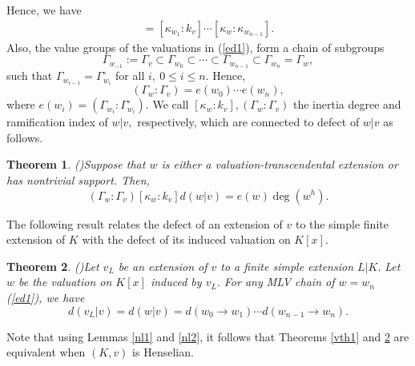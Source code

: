 \documentclass[11pt]{amsart}
\newtheorem{theorem}{Theorem}[section]
\theoremstyle{definition}
\theoremstyle{remark}
\numberwithin{equation}{section}
\begin{document}
	Hence, we have
	\begin{align*}
		[\kappa_w:k_v]=[\kappa_{w_1}:k_v]\cdots [\kappa_w:\kappa_{w_{n-1}}].
	\end{align*}
	Also, the value groups of the valuations in (\ref{ed1}), form a chain of subgroups
	\[\Gamma_{w_{-1}}:=\Gamma_v \subset \Gamma_{w_0} \subset \cdots \subset \Gamma_{w_{n-1}}\subset \Gamma_{w_n}=\Gamma_w, \]
	such that $\Gamma_{w_{i-1}}=\Gamma^\circ_{w_i}$ for all $i, \ 0\leq i \leq n.$ Hence,
	\[(\Gamma_w:\Gamma_v)=e(w_0)\cdots e(w_n),\] where $e(w_i)=(\Gamma_{w_i}:\Gamma^\circ_{w_i}).$ We call $[\kappa_w:k_v], (\Gamma_w:\Gamma_v)$ the inertia degree and  ramification index of $w|v,$ respectively, which are connected to defect of $w|v$ as follows.


	\begin{theorem}(\cite[Theorem 6.13]{EN3})\label{T1}
		Suppose that $w$ is either a valuation-transcendental extension or has nontrivial support. Then, 
		\[(\Gamma_w:\Gamma_v)[\kappa_w:k_v]d(w|v)=e(w)\deg(w^h).\] 
	\end{theorem}
		The following result relates the defect of an extension of $v$ to the simple finite extension of $K$ with the defect of its induced valuation on $K[x].$
	\begin{theorem}(\cite[Theorem 6.14]{EN3})\label{T2}
		Let $v_L$ be an extension of $v$ to a finite simple extension $L|K.$ Let $w$ be the valuation on $K[x]$ induced by $v_L.$ For any MLV chain of $w=w_n$ (\ref{ed1}), we have\[d(v_L|v)=d(w|v)=d(w_0\longrightarrow w_1)\cdots d(w_{n-1}\longrightarrow w_n).\]
	\end{theorem}
	Note that using Lemmas \ref{nl1} and \ref{nl2}, it follows that Theorems \ref{vth1} and \ref{T2} are equivalent when $(K,v)$ is Henselian.
	
\end{document}
